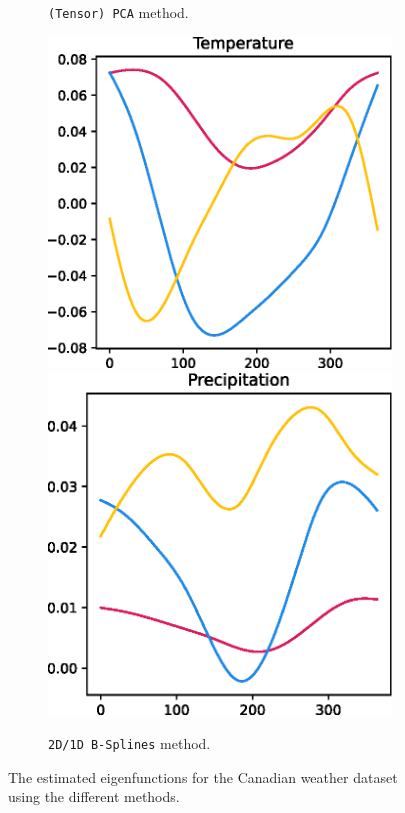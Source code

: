 \begin{figure}
\begin{subfigure}[b]{0.3\textwidth}
    \caption{\texttt{(Tensor) PCA} method.}
    \end{subfigure}
    \hfill
    \begin{subfigure}[b]{0.3\textwidth}
    \centering
    \includegraphics[width=\textwidth]{figures/eigen_temp_psplines.eps}
    \includegraphics[width=\textwidth]{figures/eigen_prec_psplines.eps}
    \caption{\texttt{2D/1D B-Splines} method.}
    \end{subfigure}
    \caption{The estimated eigenfunctions for the Canadian weather dataset using the different methods.}
    \label{fig:canadian_weather_eigenfunctions}
\end{figure}


